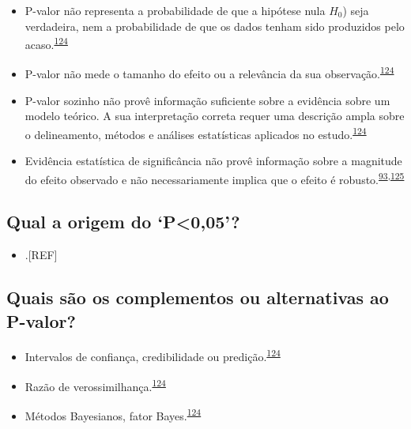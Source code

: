 \documentclass[
  a4paper,
]{book}
\providecommand{\tightlist}{%
  \setlength{\itemsep}{0pt}\setlength{\parskip}{0pt}}
\begin{document}
\begin{itemize}
\item
  P-valor não representa a probabilidade de que a hipótese nula \(H_{0}\)) seja verdadeira, nem a probabilidade de que os dados tenham sido produzidos pelo acaso.\textsuperscript{\protect\hyperlink{ref-wasserstein2016}{124}}
\item
  P-valor não mede o tamanho do efeito ou a relevância da sua observação.\textsuperscript{\protect\hyperlink{ref-wasserstein2016}{124}}
\item
  P-valor sozinho não provê informação suficiente sobre a evidência sobre um modelo teórico. A sua interpretação correta requer uma descrição ampla sobre o delineamento, métodos e análises estatísticas aplicados no estudo.\textsuperscript{\protect\hyperlink{ref-wasserstein2016}{124}}
\item
  Evidência estatística de significância não provê informação sobre a magnitude do efeito observado e não necessariamente implica que o efeito é robusto.\textsuperscript{\protect\hyperlink{ref-Landis2012}{93},\protect\hyperlink{ref-altman2017}{125}}
\end{itemize}

\hypertarget{qual-a-origem-do-p005}{%
\subsection{Qual a origem do `P\textless0,05'?}\label{qual-a-origem-do-p005}}

\begin{itemize}
\tightlist
\item
  .{[}REF{]}
\end{itemize}

\hypertarget{quais-suxe3o-os-complementos-ou-alternativas-ao-p-valor}{%
\subsection{Quais são os complementos ou alternativas ao P-valor?}\label{quais-suxe3o-os-complementos-ou-alternativas-ao-p-valor}}

\begin{itemize}
\item
  Intervalos de confiança, credibilidade ou predição.\textsuperscript{\protect\hyperlink{ref-wasserstein2016}{124}}
\item
  Razão de verossimilhança.\textsuperscript{\protect\hyperlink{ref-wasserstein2016}{124}}
\item
  Métodos Bayesianos, fator Bayes.\textsuperscript{\protect\hyperlink{ref-wasserstein2016}{124}}
\end{itemize}
\end{document}

